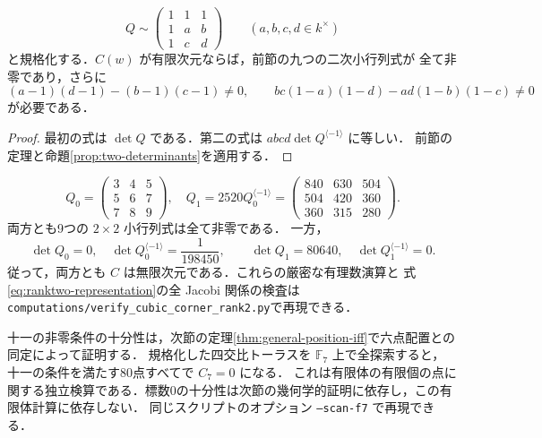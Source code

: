 \begin{corollary}[四交比座標での十一の必要条件]
\label{cor:eleven}
\[
 Q\sim
 \begin{pmatrix}1&1&1\\1&a&b\\1&c&d\end{pmatrix}
 \qquad(a,b,c,d\in k^\times)
\]
と規格化する．$C(w)$ が有限次元ならば，前節の九つの二次小行列式が
全て非零であり，さらに
\begin{equation}\label{eq:two-extra-polynomials}
 (a-1)(d-1)-(b-1)(c-1)\ne0,\qquad
 bc(1-a)(1-d)-ad(1-b)(1-c)\ne0
\end{equation}
が必要である．
\end{corollary}
\begin{proof}
最初の式は $\det Q$ である．第二の式は
$abcd\det Q^{\langle-1\rangle}$ に等しい．
前節の定理と命題\ref{prop:two-determinants}を適用する．
\end{proof}

\begin{remark}[九つの小行列式だけでは不十分]
\label{ex:ranktwo}
\[
 Q_0=\begin{pmatrix}3&4&5\\5&6&7\\7&8&9\end{pmatrix},\quad
 Q_1=2520Q_0^{\langle-1\rangle}
 =\begin{pmatrix}840&630&504\\504&420&360\\360&315&280\end{pmatrix}.
\]
両方とも9つの $2\times2$ 小行列式は全て非零である．
一方，
\[
 \det Q_0=0,\quad
 \det Q_0^{\langle-1\rangle}=\frac1{198450},\qquad
 \det Q_1=80640,\quad
 \det Q_1^{\langle-1\rangle}=0.
\]
従って，両方とも $C$ は無限次元である．これらの厳密な有理数演算と
式\eqref{eq:ranktwo-representation}の全 Jacobi 関係の検査は
\texttt{computations/verify\_cubic\_corner\_rank2.py}で再現できる．
\end{remark}

\begin{remark}[有限体での探索と限界]
十一の非零条件の十分性は，次節の定理\ref{thm:general-position-iff}で六点配置との同定によって証明する．
規格化した四交比トーラスを $\mathbb F_7$ 上で全探索すると，
十一の条件を満たす80点すべてで $C_7=0$ になる．
これは有限体の有限個の点に関する独立検算である．標数0の十分性は次節の幾何学的証明に依存し，この有限体計算に依存しない．
同じスクリプトのオプション \texttt{--scan-f7} で再現できる．
\end{remark}
